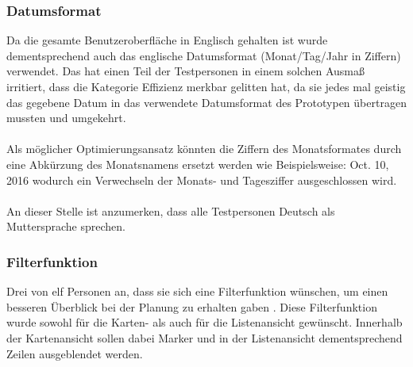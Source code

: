 \documentclass[Bachelorarbeit.tex]{subfiles}
\begin{document}
\subsubsection*{Datumsformat}
Da die gesamte Benutzeroberfläche in Englisch gehalten ist wurde dementsprechend auch das englische Datumsformat (Monat/Tag/Jahr in Ziffern) verwendet. 
Das hat einen Teil der Testpersonen in einem solchen Ausmaß irritiert, dass die Kategorie Effizienz merkbar gelitten hat, da sie jedes mal geistig das gegebene Datum in das verwendete Datumsformat des Prototypen übertragen mussten und umgekehrt.\\
\\
Als möglicher Optimierungsansatz könnten die Ziffern des Monatsformates durch eine Abkürzung des Monatsnamens ersetzt werden wie Beispielsweise: Oct. 10, 2016 wodurch ein Verwechseln der Monats- und Tagesziffer ausgeschlossen wird.  
\\
\\
An dieser Stelle ist anzumerken, dass alle Testpersonen Deutsch als Muttersprache sprechen.

\subsubsection*{Filterfunktion}
Drei von elf Personen an, dass sie sich eine Filterfunktion wünschen, um einen besseren Überblick bei der Planung zu erhalten gaben .  
Diese Filterfunktion wurde sowohl für die Karten- als auch für die Listenansicht gewünscht.
Innerhalb der Kartenansicht sollen dabei Marker und in der Listenansicht dementsprechend Zeilen ausgeblendet werden.
 
\end{document}
